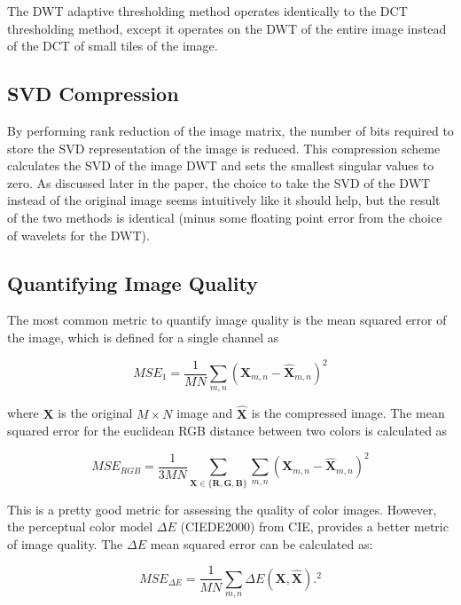 \documentclass[conference]{IEEEtran}
\begin{document}
The DWT adaptive thresholding method operates identically to the DCT thresholding method, except it operates on the DWT of the entire image instead of the DCT of small tiles of the image.

\subsection{SVD Compression}
By performing rank reduction of the image matrix, the number of bits required to store the SVD representation of the image is reduced.
This compression scheme calculates the SVD of the image DWT and sets the smallest singular values to zero.
As discussed later in the paper, the choice to take the SVD of the DWT instead of the original image seems intuitively like it should help, but the result of the two methods is identical (minus some floating point error from the choice of wavelets for the DWT).

\subsection{Quantifying Image Quality}

The most common metric to quantify image quality is the mean squared error of the image, which is defined for a single channel as

\begin{equation}
    MSE_{1} = \frac{1}{MN}\sum_{m,n}\left(\mathbf{X}_{m,n} - \mathbf{\hat{X}}_{m,n}\right)^2
\end{equation}

where $\mathbf{X}$ is the original $M\times N$ image and $\mathbf{\hat{X}}$ is the compressed image.
The mean squared error for the euclidean RGB distance between two colors is calculated as

\begin{equation}
    MSE_{RGB} = \frac{1}{3MN}\sum_{\mathbf{X}\in\{\mathbf{R},\mathbf{G},\mathbf{B}\}}\sum_{m,n}\left(\mathbf{X}_{m,n} - \mathbf{\hat{X}}_{m,n}\right)^2
\end{equation}

This is a pretty good metric for assessing the quality of color images.
However, the perceptual color model $\Delta E$ (CIEDE2000) from CIE, provides a better metric of image quality.
The $\Delta E$ mean squared error can be calculated as:

\begin{equation}
    MSE_{\Delta E} = \frac{1}{MN}\sum_{m,n}\Delta E\left(\mathbf{X}, \mathbf{\hat{X}}\right).^2
\end{equation}
\end{document}
